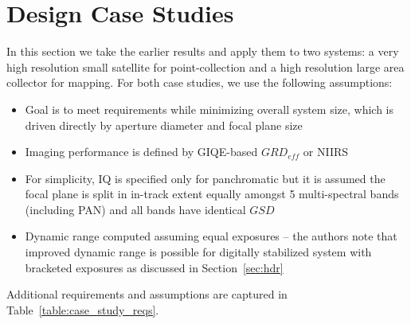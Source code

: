 \documentclass[10pt,journal]{IEEEtran}  %
\begin{document}
\section{Design Case Studies}
\label{sec:case_studies}

In this section we take the earlier results and apply them to two systems: a very high resolution small satellite for point-collection and a high resolution large area collector for mapping.  For both case studies, we use the following assumptions:

\begin{itemize}
    \item Goal is to meet requirements while minimizing overall system size, which is driven directly by aperture diameter and focal plane size
    \item Imaging performance is defined by GIQE-based $GRD_{eff}$ or NIIRS
    \item For simplicity, IQ is specified only for panchromatic but it is assumed the focal plane is split in in-track extent equally amongst 5 multi-spectral bands (including PAN) and all bands have identical $GSD$
    \item Dynamic range computed assuming equal exposures -- the authors note that improved dynamic range is possible for digitally stabilized system with bracketed exposures as discussed in Section~\ref{sec:hdr}
\end{itemize}

Additional requirements and assumptions are captured in Table~\ref{table:case_study_reqs}.
\end{document}
